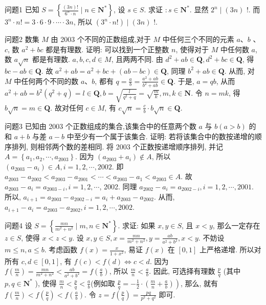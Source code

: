 
问题1 已知 $S=\left\{\frac{(3 n) !}{6^n \cdot n} \mid n \in \mathbf{N}^*\right\}$, 设 $s \in S$. 求证 $: s \in \mathbf{N}^*$.
显然 $2^n \mid(3 n)$ !. 而 $3^n \cdot n !=3 \cdot 6 \cdot 9 \cdot \cdots \cdot 3 n$, 所以 $\left(3^n \cdot n !\right) \mid(3 n)$ !.



问题2 数集 $M$ 由 2003 个不同的正数组成,对于 $M$ 中任何三个不同的元素 $a 、 b$ 、 $c$, 数 $a^2+b c$ 都是有理数.
证明: 可以找到一个正整数 $n$, 使得对于 $M$ 中任何数 $a$, 数 $a \sqrt{n}$ 都是有理数.
$a, b, c, d \in M$, 且两两不同.
由 $d^2+a b \in \mathbf{Q}, d^2+b c \in \mathbf{Q}$, 得 $b c-a b \in \mathbf{Q}$. 故 $a^2+a b=a^2+b c+(a b-b c) \in \mathbf{Q}$, 同理 $b^2+a b \in \mathbf{Q}$. 从而, 对 $M$ 中任何两个不同的数 $a 、 b$, 都有 $q=\frac{a}{b}=\frac{a^2+a b}{b^2+a b} \in \mathbf{Q}$. 于是, $a=q b$, 从而 $a^2+a b= b^2\left(q^2+q\right)=l \in \mathbf{Q}, b=\sqrt{\frac{l}{q^2+q}}=\sqrt{\frac{m}{k}}, m, k \in \mathbf{N}$. 令 $n=m k$, 得 $b \sqrt{n}=m \in \mathbf{Q}$. 故对任何 $c \in M$, 有 $c \sqrt{n}=\frac{c}{b} \cdot b \sqrt{n} \in \mathbf{Q}$.



问题3 已知由 2003 个正数组成的集合,该集合中的任意两个数 $a$ 与 $b(a>b)$ 的和 $a+b$ 与差 $a-b$ 中至少有一个属于该集合.
证明: 若将该集合中的数按递增的顺序排列, 则相邻两个数的差相同.
将 2003 个正数按递增顺序排列, 并记 $A=\left\{a_1, a_2, \cdots, a_{2003}\right\}$. 因为 $\left(a_{2003}+a_i\right) \notin A$, 所以 $\left(a_{2003}-a_i\right) \in A, i=1,2, \cdots, 2002$. 即 $a_{2003}-a_{2002}< a_{2003}-a_{2001}<\cdots<a_{2003}-a_1<a_{2003} \in A$. 故 $a_{2003}-a_i=a_{2003-i}, i=1,2, \cdots$, 2002. 同理 $a_{2002}-a_i=a_{2002-i}, i=1,2, \cdots, 2001$. 所以, $a_{i+1}=a_{2003}-a_{2002-i}= a_i+a_{2003}-a_{2002}$. 从而, $a_{i+1}-a_i=a_{2003}-a_{2002}, i=1,2, \cdots, 2002$.



问题4 设 $S=\left\{\frac{m n}{m^2+n^2} \mid m, n \in \mathbf{N}^*\right\}$. 求证: 如果 $x, y \in S$, 且 $x<y$, 那么一定存在 $z \in S$, 使得 $x<z<y$.
设 $x, y \in S, x=\frac{m n}{m^2+n^2}, y=\frac{a b}{a^2+b^2}, x<y$. 不妨设 $m \leqslant n, a \leqslant b$. 考虑函数 $f(x)=\frac{x}{1+x^2}$, 易证 $f(x)$ 在 $[0,1]$ 上严格递增.
所以对所有 $c, d \in[0,1]$, 有 $f(c)<f(d) \Leftrightarrow c<d$. 因为 $f\left(\frac{m}{n}\right)=\frac{m n}{m^2+n^2}<\frac{a b}{a^2+b^2}=f\left(\frac{a}{b}\right)$, 所以 $\frac{m}{n}<\frac{a}{b}$. 因此, 可选择有理数 $\frac{p}{q}$ (其中 $p, q \in \mathbf{N}^*$ ), 使得 $\frac{m}{n}<\frac{p}{q}<\frac{a}{b}$(例如取 $\left.\frac{p}{q}=-\frac{1}{2} \cdot\left(\frac{m}{n}+\frac{a}{b}\right)\right)$, 那么, 就有 $f\left(\frac{m}{n}\right)<f\left(\frac{p}{q}\right)<f\left(\frac{a}{b}\right)$. 令 $z=f \left(\frac{p}{q}\right)=\frac{p q}{p^2+q^2}$ 即可.



